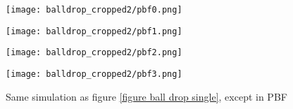 \begin{figure}[H]
    \centering
    
    \begin{minipage}[t]{.42\linewidth}
        \centering
        \vspace{0pt}
        \texttt{[image: balldrop\_cropped2/pbf0.png]}
    \end{minipage}
    \begin{minipage}[t]{.42\linewidth}
        \centering
        \vspace{0pt}
        \texttt{[image: balldrop\_cropped2/pbf1.png]}
    \end{minipage}

    \vspace{0.5cm}

    \begin{minipage}[t]{.42\linewidth}
        \centering
        \vspace{0pt}
        \texttt{[image: balldrop\_cropped2/pbf2.png]}
    \end{minipage}
    \begin{minipage}[t]{.42\linewidth}
        \centering
        \vspace{0pt}
        \texttt{[image: balldrop\_cropped2/pbf3.png]}
    \end{minipage}

    \caption{Same simulation as figure \ref{figure ball drop single}, except in PBF}
    \label{figure ball drop pbf}
\end{figure}
